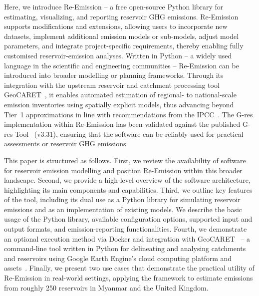 \documentclass[review, authoryear, 1p]{elsarticle} %
\begin{document}

Here, we introduce Re-Emission -- a free open-source Python library for estimating, visualizing, and reporting reservoir \ac{GHG} emissions. 
Re-Emission supports modifications and extensions, allowing users to incorporate new datasets, implement additional emission models or sub-models, adjust model parameters, and integrate project-specific requirements, thereby enabling fully customised reservoir-emission analyses.
Written in Python -- a widely used language in the scientific and engineering communities -- Re-Emission can be introduced into broader modelling or planning frameworks. 
Through its integration with the upstream reservoir and catchment processing tool GeoCARET~\citep{heettool}, it enables automated estimation of regional- to national-scale emission inventories using spatially explicit models, thus advancing beyond Tier~1 approximations in line with recommendations from the IPCC~\citep{IPCC2019}.
The G-res implementation within Re-Emission has been validated against the published G-res Tool~\citep{prairie2017gres, Prairie2021} (v3.31), ensuring that the software can be reliably used for practical assessments or reservoir \ac{GHG} emissions.

This paper is structured as follows.
First, we review the availability of software for reservoir emission modelling and position Re-Emission within this broader landscape.
Second, we provide a high-level overview of the software architecture, highlighting its main components and capabilities.
Third, we outline key features of the tool, including its dual use as a Python library for simulating reservoir emissions and as an implementation of existing models. 
We describe the basic usage of the Python library, available configuration options, supported input and output formats, and emission-reporting functionalities.
Fourth, we demonstrate an optional execution method via Docker and integration with GeoCARET~\citep{heettool} -- a command-line tool written in Python for delineating and analysing catchments and reservoirs using Google Earth Engine's cloud computing platform and assets~\citep{Gorelick2017}. 
Finally, we present two use cases that demonstrate the practical utility of Re-Emission in real-world settings, applying the framework to estimate emissions from roughly 250 reservoirs in Myanmar and the United Kingdom.
\end{document}
